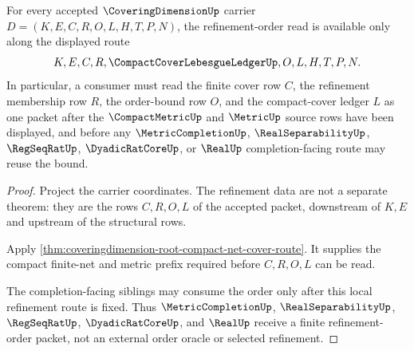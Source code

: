 \begin{theorem}
\label{thm:coveringdimension-root-refinement-order-route}
For every accepted $\CoveringDimensionUp$ carrier $D=(K,E,C,R,O,L,H,T,P,N)$, the refinement-order read is available only along the displayed route
$$
K,E,C,R,\CompactCoverLebesgueLedgerUp,O,L,H,T,P,N .
$$
In particular, a consumer must read the finite cover row $C$, the refinement membership row $R$, the order-bound row $O$, and the compact-cover ledger $L$ as one packet after the $\CompactMetricUp$ and $\MetricUp$ source rows have been displayed, and before any $\MetricCompletionUp$, $\RealSeparabilityUp$, $\RegSeqRatUp$, $\DyadicRatCoreUp$, or $\RealUp$ completion-facing route may reuse the bound.
\end{theorem}
\begin{proof}
Project the carrier coordinates. The refinement data are not a separate theorem: they are the rows $C,R,O,L$ of the accepted packet, downstream of $K,E$ and upstream of the structural rows.

Apply \autoref{thm:coveringdimension-root-compact-net-cover-route}. It supplies the compact finite-net and metric prefix required before $C,R,O,L$ can be read.

The completion-facing siblings may consume the order only after this local refinement route is fixed. Thus $\MetricCompletionUp$, $\RealSeparabilityUp$, $\RegSeqRatUp$, $\DyadicRatCoreUp$, and $\RealUp$ receive a finite refinement-order packet, not an external order oracle or selected refinement.
\end{proof}


